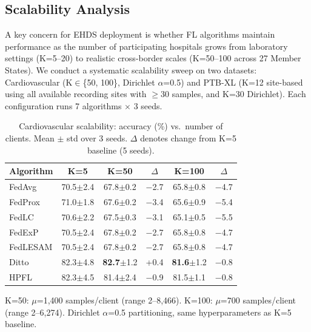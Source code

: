 \documentclass[conference]{IEEEtran}
\begin{document}
\subsection{Scalability Analysis}
\label{sec:scalability}

A key concern for EHDS deployment is whether FL algorithms maintain performance as the number of participating hospitals grows from laboratory settings (K=5--20) to realistic cross-border scales (K=50--100 across 27 Member States). We conduct a systematic scalability sweep on two datasets: Cardiovascular (K$\in$\{50, 100\}, Dirichlet $\alpha$=0.5) and PTB-XL (K=12 site-based using all available recording sites with $\geq$30 samples, and K=30 Dirichlet). Each configuration runs 7 algorithms $\times$ 3 seeds.

\begin{table}[htbp]
\centering
\caption{Cardiovascular scalability: accuracy (\%) vs.\ number of clients. Mean $\pm$ std over 3 seeds. $\Delta$ denotes change from K=5 baseline (5 seeds).}
\label{tab:cv_scalability}
\small
\begin{tabular}{lccccc}
\toprule
\textbf{Algorithm} & \textbf{K=5} & \textbf{K=50} & \textbf{$\Delta$} & \textbf{K=100} & \textbf{$\Delta$} \\
\midrule
FedAvg & 70.5{\tiny$\pm$2.4} & 67.8{\tiny$\pm$0.2} & $-$2.7 & 65.8{\tiny$\pm$0.8} & $-$4.7 \\
FedProx & 71.0{\tiny$\pm$1.8} & 67.6{\tiny$\pm$0.2} & $-$3.4 & 65.6{\tiny$\pm$0.9} & $-$5.4 \\
FedLC & 70.6{\tiny$\pm$2.2} & 67.5{\tiny$\pm$0.3} & $-$3.1 & 65.1{\tiny$\pm$0.5} & $-$5.5 \\
FedExP & 70.5{\tiny$\pm$2.4} & 67.8{\tiny$\pm$0.2} & $-$2.7 & 65.8{\tiny$\pm$0.8} & $-$4.7 \\
FedLESAM & 70.5{\tiny$\pm$2.4} & 67.8{\tiny$\pm$0.2} & $-$2.7 & 65.8{\tiny$\pm$0.8} & $-$4.7 \\
\midrule
Ditto & 82.3{\tiny$\pm$4.8} & \textbf{82.7}{\tiny$\pm$1.2} & +0.4 & \textbf{81.6}{\tiny$\pm$1.2} & $-$0.8 \\
HPFL & 82.3{\tiny$\pm$4.5} & 81.4{\tiny$\pm$2.4} & $-$0.9 & 81.5{\tiny$\pm$1.1} & $-$0.8 \\
\bottomrule
\end{tabular}

\vspace{1mm}
\footnotesize{K=50: $\mu$=1,400 samples/client (range 2--8,466). K=100: $\mu$=700 samples/client (range 2--6,274). Dirichlet $\alpha$=0.5 partitioning, same hyperparameters as K=5 baseline.}
\end{table}
\end{document}
